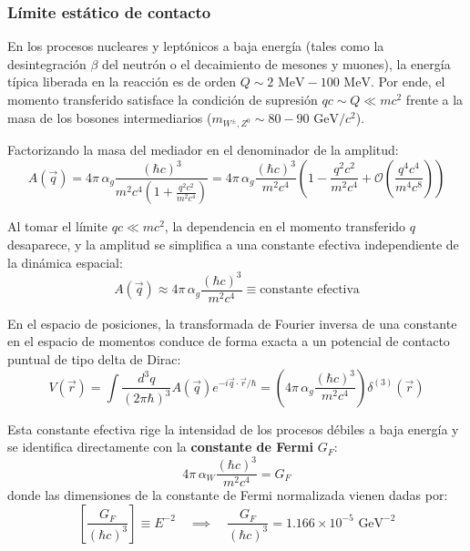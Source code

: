\subsubsection*{Límite estático de contacto}

En los procesos nucleares y leptónicos a baja energía (tales como la desintegración $\beta$ del neutrón o el decaimiento de mesones y muones), la energía típica liberada en la reacción es de orden $Q \sim 2 \text{ MeV} - 100 \text{ MeV}$. Por ende, el momento transferido satisface la condición de supresión $qc \sim Q \ll mc^2$ frente a la masa de los bosones intermediarios ($m_{W^\pm, Z^0} \sim 80 - 90 \text{ GeV}/c^2$).

Factorizando la masa del mediador en el denominador de la amplitud:
\begin{equation}
    A(\vec{q}) = 4\pi \, \alpha_g \frac{(\hbar c)^3}{m^2 c^4 \left( 1 + \frac{q^2 c^2}{m^2 c^4} \right)} = 4\pi \, \alpha_g \frac{(\hbar c)^3}{m^2 c^4} \left( 1 - \frac{q^2 c^2}{m^2 c^4} + \mathcal{O}\left( \frac{q^4 c^4}{m^4 c^8} \right) \right)
\end{equation}

Al tomar el límite $qc \ll mc^2$, la dependencia en el momento transferido $q$ desaparece, y la amplitud se simplifica a una constante efectiva independiente de la dinámica espacial:
\begin{equation}
    A(\vec{q}) \approx 4\pi \, \alpha_g \frac{(\hbar c)^3}{m^2 c^4} \equiv \text{constante efectiva}
\end{equation}

En el espacio de posiciones, la transformada de Fourier inversa de una constante en el espacio de momentos conduce de forma exacta a un potencial de contacto puntual de tipo delta de Dirac:
\begin{equation}
    V(\vec{r}) = \int \frac{d^3q}{(2\pi\hbar)^3} A(\vec{q}) e^{-i \vec{q} \cdot \vec{r} / \hbar} = \left( 4\pi \, \alpha_g \frac{(\hbar c)^3}{m^2 c^4} \right) \delta^{(3)}(\vec{r})
\end{equation}

Esta constante efectiva rige la intensidad de los procesos débiles a baja energía y se identifica directamente con la \textbf{constante de Fermi} $G_F$:
\begin{equation}
    4\pi \, \alpha_W \frac{(\hbar c)^3}{m^2 c^4} = G_F
\end{equation}
donde las dimensiones de la constante de Fermi normalizada vienen dadas por:
\begin{equation}
    \left[ \frac{G_F}{(\hbar c)^3} \right] \equiv E^{-2} \quad \implies \quad \frac{G_F}{(\hbar c)^3} = 1.166 \times 10^{-5} \text{ GeV}^{-2}
\end{equation}

